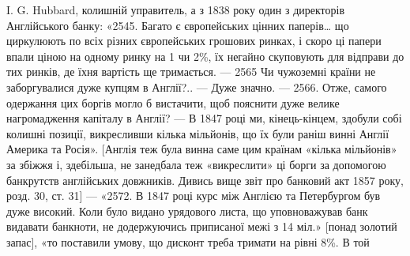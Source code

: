 I. G. Hubbard, колишній управитель, а з 1838 року один з директорів
Англійського банку: «2545. Багато є європейських цінних паперів\dots{} що циркулюють
по всіх різних європейських грошових ринках, і скоро ці папери впали
ціною на одному ринку на 1 чи 2\%, їх негайно скуповують для відправи до
тих ринків, де їхня вартість ще тримається. — 2565 Чи чужоземні країни не
заборгувалися дуже купцям в Англії?.. — Дуже значно. — 2566. Отже, самого
одержання цих боргів могло б вистачити, щоб пояснити дуже велике нагромадження
капіталу в Англії? — В 1847 році ми, кінець-кінцем, здобули собі колишні
позиції, викресливши кілька мільйонів, що їх були раніш винні Англії
Америка та Росія». [Англія теж була винна саме цим країнам «кілька мільйонів» за
збіжжя і, здебільша, не занедбала теж «викреслити» ці борги за допомогою
банкрутств англійських довжників. Дивись вище звіт про банковий акт 1857 року,
розд. 30, ст. 31] — «2572. В 1847 році курс між Англією та Петербургом був
дуже високий. Коли було видано урядового листа, що уповноважував банк видавати
банкноти, не додержуючись приписаної межі з 14 міл.» [понад золотий
запас], «то поставили умову, що дисконт треба тримати на рівні 8\%. В той
\parbreak{}  %
